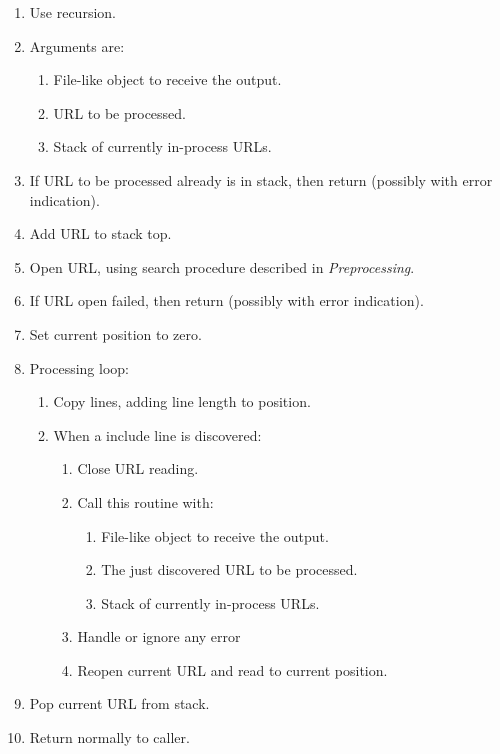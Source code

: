 \documentclass[twoside]{memarticle}
\begin{document}
\begin{enumerate}
\item Use recursion.
\item Arguments are:
\begin{enumerate}
\item File-like object to receive the output.
\item URL to be processed.
\item Stack of currently in-process URLs.
\end{enumerate}
\item If URL to be processed already is in stack,
      then return (possibly with error indication).
\item Add URL to stack top.
\item Open URL, using search procedure described in {\em Preprocessing}.
\item If URL open failed,
      then return (possibly with error indication).
\item Set current position to zero.
\item Processing loop:
\begin{enumerate}
\item Copy lines, adding line length to position.
\item When a include line is discovered:
\begin{enumerate}
\item Close URL reading.
\item Call this routine with:
\begin{enumerate}
\item File-like object to receive the output.
\item The just discovered URL to be processed.
\item Stack of currently in-process URLs.
\end{enumerate}
\item Handle or ignore any error
\item Reopen current URL and read to current position.
\end{enumerate}
\end{enumerate}
\item Pop current URL from stack.
\item Return normally to caller.
\end{enumerate}


\printindex
\end{document}
